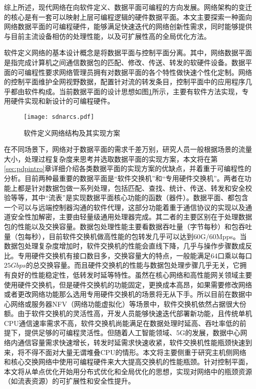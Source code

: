 综上所述，现代网络在向软件定义、数据平面可编程的方向发展。网络架构的变迁的核心是有一套可以映射上层可编程逻辑的硬件数据平面。本文主要探索一种面向网络数据平面的可编程硬件，能够满足快速迭代的网络创新性需求，同时能够提供与目前主流设备相仿的处理性能，以及可扩展性高的全局优化方法。


软件定义网络的基本设计概念是将数据平面与控制平面分离。其中，网络数据平面是指完成计算机之间通信数据包的匹配、修改、传送、转发的软硬件设备。数据平面的可编程性要求网络管理员拥有对数据平面的各个特性做快速个性化定制。网络的控制平面维护全网视野数据，配置针对流的转发条目，控制平面中的应用程序几乎都由软件构成。当前数据平面的设计思想如图\ref{fig:sdnarcs}所示，主要有软件方法实现，专用硬件实现和新设计的可编程硬件。

\begin{figure}[!ht]
	\centering
	\texttt{[image: sdnarcs.pdf]}
	\caption{软件定义网络结构及其实现方案} \label{fig:sdnarcs}
\end{figure}

在不同场景下，网络对于数据平面的需求千差万别，研究人员一般根据场景的流量大小，处理过程复杂度来思考并选取数据平面的实现方案，本文将在第\ref{sec:pdpintro}章详细介绍各类数据平面的实现方案的优缺点，并着重于可编程性的分析。目前两种最重要的数据平面是“软件交换机”和“专用硬件交换机”。两者在功能上都是针对数据包做一系列处理，包括匹配、查找、统计、传送、转发和安全校验等等，其中“流表”是实现数据平面核心功能的函数（器件）。数据平面、都包含一个可以与远端控制器沟通的软件代理，这部分功能着重于通信协议的实现以及通道安全性加解密，主要由轻量级通用处理器完成。其二者的主要区别在于处理数据包的性能以及交换容量。数据包处理性能主要看数据吞吐量（字节每秒）和包吞吐量（包每秒），目前软件交换机做高性能的包转发几乎可以达到60G/60Mpps。当数据包处理复杂度增加时，软件交换机的性能会直线下降，几乎与操作步骤数成反比。专用硬件交换机有接口数目多，交换容量大的特点，一般能满足64口乘以每口$25Gbps$的总交换容量。而且硬件交换机的性能与数据包处理步骤几乎无关，它拥有良好的性能稳定性，低转发时延等特性。虽然在核心网络和高性能网关领域主要使用硬件交换机，但是硬件交换机的功能固定，更换成本高昂，如果需要修改网络或者更改网络功能那么选用专用硬件交换机的场景将无从下手。所以目前在数据中心网络或服务器NFV（网络功能虚拟化）等场景中，软件交换机依然占据很大份额。由于软件交换机的灵活性高，开发人员能够快速迭代部署新功能，且传统单机CPU通信速率需求不高，软件交换机尚能满足在数据处理时延高、吞吐率低的前提下，提供足够的可编程灵活性。但随着人工智能领域、5G的发展，数据中心网络内通信容量需求快速增长，转发时延需求快速收紧，软件交换机性能瓶颈快速到来，将不得不面对大量无谓堆叠CPU的情形。本文将主要侧重于研究主机侧网络和核心交换网络中使用可编程硬件来大大提高交换机的性能瓶颈。针对控制平面，本文将从单点优化开始用分布式优化和全局优化的思想，实现对网络中的瓶颈资源（如流表资源）的可扩展性和安全性提升。

